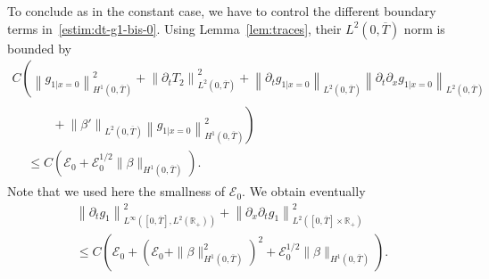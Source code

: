 \documentclass[10pt]{amsart}
\theoremstyle{definition}\newtheorem{defi}[theo]{Definition}\newtheorem{rema}[theo]{Remark}\newtheorem{exam}[theo]{Example}\newtheorem{exem}[theo]{Example}\newtheorem{nota}[theo]{Notation}
\newcommand{\R}{\mathbb{R}}
\newcommand{\p}{\partial}
\newcommand{\cE}{\mathcal E}
\begin{document}
To conclude as in the constant case, we have to control the different boundary terms in~\eqref{estim:dt-g1-bis-0}. Using Lemma~\ref{lem:traces}, their $L^2(0,\overline{T})$ norm is bounded by
\begin{multline*}
C\left(\left\| g_{1|x=0}\right\|_{H^1\left(0,\overline{T}\right)}^2 + \left\|\p_t T_2\right\|_{L^2\left(0,\overline{T}\right)}^2 + \left\|\p_t g_{1|x=0}\right\|_{L^2\left(0,\overline{T}\right)} \left\|\p_t \p_x g_{1|x=0}\right\|_{L^2\left(0,\overline{T}\right)}\right. \\
\begin{aligned}
&\qquad+\left. \left\|\beta'\right\|_{L^2\left(0,\overline{T}\right)} \left\|g_{1|x=0}\right\|_{H^1\left(0,\overline{T}\right)}^2\right)\\
&\leq {C \left(\cE_0 + \cE_0^{1/2} \|\beta\|_{H^1\left(0,\overline{T}\right)}\right)}.
\end{aligned}
\end{multline*}
Note that we used here the smallness of $\cE_0$. We obtain eventually
\begin{multline*}
\left\|\p_t g_1\right\|_{L^\infty\left([0,\overline{T}], L^2(\R_+)\right)}^2 + \left\|\p_x\p_t g_1\right\|_{L^2\left([0,\overline{T}]\times \R_+\right)}^2 \\
\leq C \left(\cE_0 + \left(\cE_0 + \|\beta\|_{H^1\left(0,\overline{T}\right)}^2\right)^2 + { \cE_0^{1/2} \|\beta\|_{H^1\left(0,\overline{T}\right)}}
\right).
\end{multline*}
\end{document}
